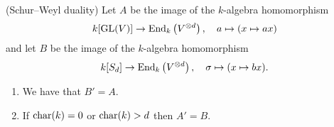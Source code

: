 \begin{theorem}(Schur--Weyl duality)
  \label{theorem: schur weyl duality}
  Let $A$ be the image of the $k$-algebra homomorphism
  \[
            k[\operatorname{GL}(V)]
    \to     \operatorname{End}_k\left( V^{\mathbin{\otimes} d} \right),
    \quad   a
    \mapsto (x \mapsto ax)
  \]
  and let $B$ be the image of the $k$-algebra homomorphism
  \[
            k[S_d]
    \to     \operatorname{End}_k\left( V^{\mathbin{\otimes} d} \right),
    \quad   \sigma
    \mapsto (x \mapsto bx).
  \]
  \begin{enumerate}
    \item \label{enum: end gl = sd}
      We have that $B' = A$.
    \item \label{enum: end sd = gl}
      If $\operatorname{char}(k) = 0$ or $\operatorname{char}(k) > d$ then $A' = B$.
  \end{enumerate}
\end{theorem}


